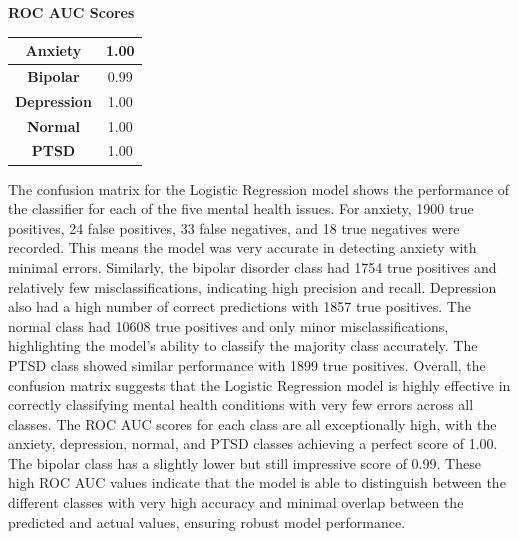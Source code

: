\vspace{1em}

\begin{center}
    \textbf{ROC AUC Scores} \\[0.5em]
    \begin{tabular}{|c|c|}
        \hline
        \textbf{Anxiety} & 1.00 \\ \hline
        \textbf{Bipolar} & 0.99 \\ \hline
        \textbf{Depression} & 1.00 \\ \hline
        \textbf{Normal} & 1.00 \\ \hline
        \textbf{PTSD} & 1.00 \\ \hline
    \end{tabular}
\end{center}

\noindent
The confusion matrix for the Logistic Regression model shows the performance of the classifier for each of the five mental health issues. For anxiety, 1900 true positives, 24 false positives, 33 false negatives, and 18 true negatives were recorded. This means the model was very accurate in detecting anxiety with minimal errors. Similarly, the bipolar disorder class had 1754 true positives and relatively few misclassifications, indicating high precision and recall. Depression also had a high number of correct predictions with 1857 true positives. The normal class had 10608 true positives and only minor misclassifications, highlighting the model's ability to classify the majority class accurately. The PTSD class showed similar performance with 1899 true positives. Overall, the confusion matrix suggests that the Logistic Regression model is highly effective in correctly classifying mental health conditions with very few errors across all classes. The ROC AUC scores for each class are all exceptionally high, with the anxiety, depression, normal, and PTSD classes achieving a perfect score of 1.00. The bipolar class has a slightly lower but still impressive score of 0.99. These high ROC AUC values indicate that the model is able to distinguish between the different classes with very high accuracy and minimal overlap between the predicted and actual values, ensuring robust model performance.

